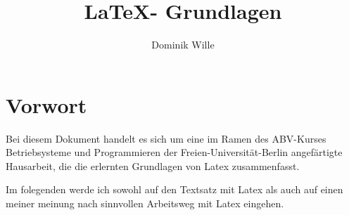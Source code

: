 \documentclass{article}
\title{\LaTeX - Grundlagen}
\author{Dominik Wille}
\begin{document}
  \maketitle
  \section{Vorwort}
  Bei diesem Dokument handelt es sich um eine im Ramen des ABV-Kurses Betriebsysteme und Programmieren der
  Freien-Universität-Berlin angefärtigte Hausarbeit, die die erlernten Grundlagen von Latex zusammenfasst.

  Im folegenden werde ich sowohl auf den Textsatz mit Latex als auch auf einen meiner meinung nach sinnvollen
  Arbeitsweg mit Latex eingehen.
  
\end{document}
